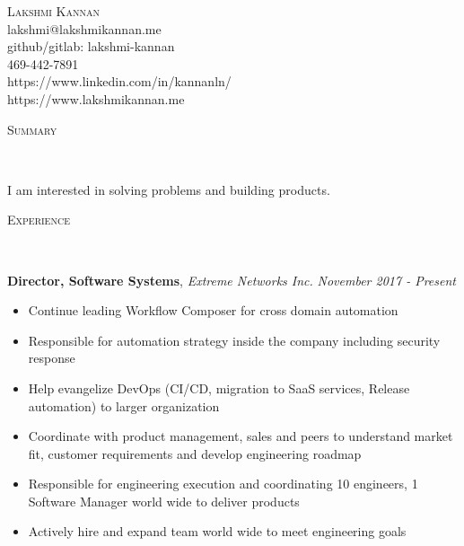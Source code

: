 \documentclass[9pt]{article}
\newenvironment{changemargin}[2]{%
  \begin{list}{}{%
    \setlength{\topsep}{0pt}%
    \setlength{\leftmargin}{#1}%
    \setlength{\rightmargin}{#2}%
    \setlength{\listparindent}{\parindent}%
    \setlength{\itemindent}{\parindent}%
    \setlength{\parsep}{\parskip}%
  }%
  \item[]}{\end{list}
}
\newcommand{\lineover}{
	\begin{changemargin}{-0.05in}{-0.05in}
		\vspace*{-8pt}
		\hrulefill \\
		\vspace*{-2pt}
	\end{changemargin}
}
\newcommand{\header}[1]{
	\begin{changemargin}{-0.5in}{-0.5in}
		\scshape{#1}\\
  	\lineover
	\end{changemargin}
}
\newcommand{\contact}[6]{
	\begin{changemargin}{-0.5in}{-0.5in}
		\begin{center}
			{\Large \scshape {#1}}\\ \smallskip
			{#2}\\ \smallskip
			{#3}\\ \smallskip
      {#4}\\ \smallskip
			{#5}\\ \smallskip
			{#6}\smallskip
		\end{center}
	\end{changemargin}
}
\newenvironment{body} {
	\vspace*{-16pt}
	\begin{changemargin}{-0.25in}{-0.5in}
  }
	{\end{changemargin}
}
\begin{document}
\contact{Lakshmi Kannan}{lakshmi@lakshmikannan.me}{github/gitlab: lakshmi-kannan}{469-442-7891}{https://www.linkedin.com/in/kannanln/}{https://www.lakshmikannan.me}

\header{Summary}

\begin{body}
	\vspace{14pt}
	I am interested in solving problems and building products.
\end{body}

\smallskip


\header{Experience}

\begin{body}
    \vspace{20pt}
    \textbf{Director, Software Systems}, \emph{Extreme Networks Inc.} \hfill \emph{November 2017 - Present}\\
    \begin{itemize} \itemsep -0pt  %
    \item Continue leading Workflow Composer for cross domain automation
    \item Responsible for automation strategy inside the company including security response
    \item Help evangelize DevOps (CI/CD, migration to SaaS services, Release automation) to larger organization
    \item Coordinate with product management, sales and peers to understand market fit, customer requirements and develop engineering roadmap
    \item Responsible for engineering execution and coordinating 10 engineers, 1 Software Manager world wide to deliver products
    \item Actively hire and expand team world wide to meet engineering goals
    \end{itemize}


\end{body}
\end{document}
